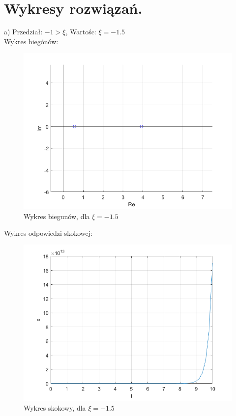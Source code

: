 \documentclass{article}
\begin{document}
 
\section{Wykresy rozwiązań.}


\begin{flushleft}
 a)  Przedział: $-1>\xi$, Wartośc: $\xi=-1.5$\\
 
 
  Wykres biegónów:\\
 \begin{figure}[h!]
    \centering
    \includegraphics[scale=0.6]{bieguny_ksi_-1_5.png}
    \caption{Wykres biegunów, dla $\xi=-1.5$}
    \label{fig:bieguny_ksi_-1_5}
 \end{figure}
 
 
 Wykres odpowiedzi skokowej:\\
 \begin{figure}[h!]
    \centering
    \includegraphics[scale=0.6]{ksi_-1_5.png}
    \caption{Wykres skokowy, dla $\xi=-1.5$}
    \label{fig:ksi_-1_5}
 \end{figure}
 

\end{flushleft}
\end{document}
